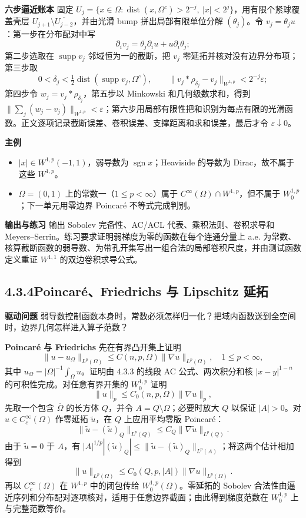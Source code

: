 \documentclass[11pt,a4paper]{ctexart}
\newcommand{\supp}{\operatorname{supp}}
\newcommand{\dist}{\operatorname{dist}}
\newcommand{\planitem}[1]{\par\smallskip\noindent\textcolor{deepblue}{\textbf{#1}}\quad}
\newcommand{\unithead}[2]{\subsection{#1\quad #2}}
\begin{document}
\planitem{六步逼近账本}
固定 $U_j=\{x\in\Omega:\dist(x,\Omega^c)>2^{-j},\ |x|<2^j\}$，用有限个紧球覆盖壳层
$U_{j+1}\setminus\overline{U_{j-2}}$，并由光滑 bump 拼出局部有限单位分解 $(\theta_j)$。令
$v_j=\theta_j u$：第一步在分布配对中写
\[
 \partial_i v_j=\theta_j\partial_i u+u\partial_i\theta_j;
\]
第二步选取在 $\supp v_j$ 邻域恒为一的截断，把 $v_j$ 零延拓并核对没有边界分布项；第三步取
\[
 0<\delta_j<\tfrac12\dist(\supp v_j,\Omega^c),\qquad
 \|v_j*\rho_{\delta_j}-v_j\|_{W^{1,p}}<2^{-j}\varepsilon;
\]
第四步令 $w_j=v_j*\rho_{\delta_j}$，第五步以 Minkowski 和几何级数求和，得到
$\|\sum_j(w_j-v_j)\|_{W^{1,p}}<\varepsilon$；第六步用局部有限性把和识别为每点有限的光滑函数。正文逐项记录截断误差、卷积误差、支撑距离和求和误差，最后才令 $\varepsilon\downarrow0$。

\planitem{主例}
\begin{itemize}
\item $|x|\in W^{1,p}(-1,1)$，弱导数为 $\operatorname{sgn}x$；Heaviside 的导数为 Dirac，故不属于这些 $W^{1,p}$。
\item $\Omega=(0,1)$ 上的常数一（$1\le p<\infty$）属于 $C^\infty(\Omega)\cap W^{1,p}$，但不属于 $W_0^{1,p}$；下一单元用零边界 Poincar\'e 不等式完成判别。
\end{itemize}

\planitem{输出与练习}
输出 Sobolev 完备性、AC/ACL 代表、乘积法则、卷积求导和 Meyers--Serrin。练习要求证明弱梯度为零的函数在每个连通分量上 a.e. 为常数、核算截断函数的弱导数、为带孔开集写出一组合法的局部卷积尺度，并由测试函数定义重证 $W^{1,1}$ 的双边卷积求导公式。

\unithead{4.3.4}{Poincar\'e、Friedrichs 与 Lipschitz 延拓}

\planitem{驱动问题}
弱导数控制函数本身时，常数必须怎样归一化？把域内函数送到全空间时，边界几何怎样进入算子范数？

\planitem{Poincar\'e 与 Friedrichs}
先在有界凸开集上证明
\[
\|u-u_\Omega\|_{L^p(\Omega)}
\le C(n,p,\Omega)\|\nabla u\|_{L^p(\Omega)},
\quad 1\le p<\infty,
\]
其中 $u_\Omega=|\Omega|^{-1}\int_\Omega u$。证明由 4.3.3 的线段 AC 公式、两次积分和核 $|x-y|^{1-n}$ 的可积性完成。对任意有界开集的 $W_0^{1,p}$ 证明
\[
\|u\|_p\le C_0(n,p,\Omega)\|\nabla u\|_p,
\]
先取一个包含 $\overline\Omega$ 的长方体 $Q$，并令 $A=Q\setminus\Omega$；必要时放大 $Q$ 以保证 $|A|>0$。对 $u\in C_c^\infty(\Omega)$ 作零延拓 $\widetilde u$，在 $Q$ 上应用平均零版 Poincar\'e：
\[
 \|\widetilde u-(\widetilde u)_Q\|_{L^p(Q)}
 \le C_Q\|\nabla\widetilde u\|_{L^p(Q)}.
\]
由于 $\widetilde u=0$ 于 $A$，有
$|A|^{1/p}|(\widetilde u)_Q|\le
\|\widetilde u-(\widetilde u)_Q\|_{L^p(A)}$；将这两个估计相加得到
\[
 \|u\|_{L^p(\Omega)}\le C_0(Q,p,|A|)\|\nabla u\|_{L^p(\Omega)}.
\]
再以 $C_c^\infty(\Omega)$ 在 $W^{1,p}$ 中的闭包传给 $W_0^{1,p}(\Omega)$。零延拓的
Sobolev 合法性由逼近序列和分布配对逐项核对，适用于任意边界截面；由此得到梯度范数在
$W_0^{1,p}$ 上与完整范数等价。
\end{document}
